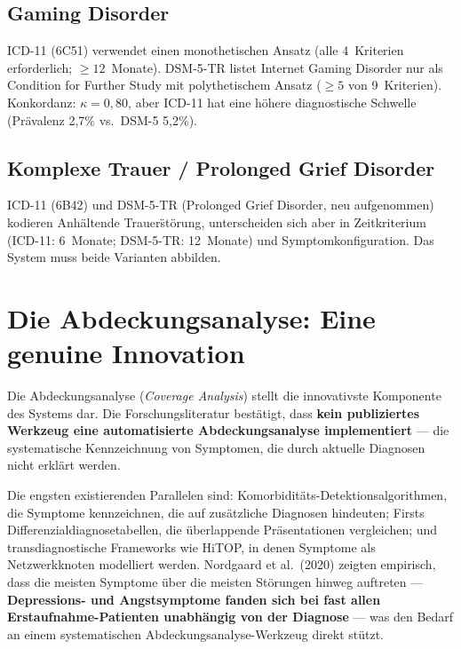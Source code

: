 \documentclass[11pt,a4paper]{article}
\begin{document}
\subsection{Gaming Disorder}

ICD-11 (6C51) verwendet einen monothetischen Ansatz (alle 4~Kriterien erforderlich; $\geq 12$~Monate). DSM-5-TR listet Internet Gaming Disorder nur als \glqq Condition for Further Study\grqq{} mit polythetischem Ansatz ($\geq 5$ von 9~Kriterien). Konkordanz: $\kappa = 0{,}80$, aber ICD-11 hat eine h\"ohere diagnostische Schwelle (Pr\"avalenz 2,7\% vs.\ DSM-5 5,2\%).

\subsection{Komplexe Trauer / Prolonged Grief Disorder}

ICD-11 (6B42) und DSM-5-TR (Prolonged Grief Disorder, neu aufgenommen) kodieren Anh\"altende Trauer\"st\"orung, unterscheiden sich aber in Zeitkriterium (ICD-11: 6~Monate; DSM-5-TR: 12~Monate) und Symptomkonfiguration. Das System muss beide Varianten abbilden.


\section{Die Abdeckungsanalyse: Eine genuine Innovation}
\label{sec:abdeckung}

Die Abdeckungsanalyse (\textit{Coverage Analysis}) stellt die innovativste Komponente des Systems dar. Die Forschungsliteratur best\"atigt, dass \textbf{kein publiziertes Werkzeug eine automatisierte Abdeckungsanalyse implementiert} --- die systematische Kennzeichnung von Symptomen, die durch aktuelle Diagnosen nicht erkl\"art werden.

Die engsten existierenden Parallelen sind: Komorbidit\"ats-Detektionsalgorithmen, die Symptome kennzeichnen, die auf zus\"atzliche Diagnosen hindeuten; Firsts Differenzialdiagnosetabellen, die \"uberlappende Pr\"asentationen vergleichen; und transdiagnostische Frameworks wie HiTOP, in denen Symptome als Netzwerkknoten modelliert werden. Nordgaard et al.\ (2020) zeigten empirisch, dass die meisten Symptome \"uber die meisten St\"orungen hinweg auftreten --- \textbf{Depressions- und Angstsymptome fanden sich bei fast allen Erstaufnahme-Patienten unabh\"angig von der Diagnose} --- was den Bedarf an einem systematischen Abdeckungsanalyse-Werkzeug direkt st\"utzt.
\end{document}

